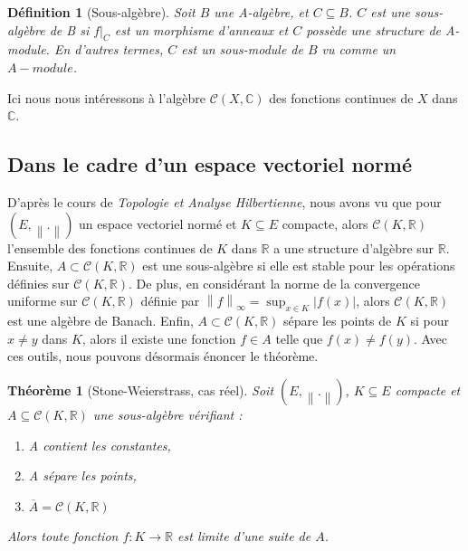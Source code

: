 \documentclass{amsart}
\newtheorem{definition}[subsubsection]{Définition}
\newtheorem{theorem}[subsubsection]{Théorème}
\begin{document}
\begin{definition}[Sous-algèbre]
	Soit \( B \) une \textit{A-algèbre}, et \( C \subseteq B \). 
	\( C \) est une \textit{sous-algèbre de B} si 
	\( {f|}_C \) est un morphisme d'anneaux 
	et \( C \) possède une structure de \textit{A-module}. 
	En d'autres termes, \( C \) est un \textit{sous-module} de \( B \) 
	vu comme un \( A-module \).
\end{definition}

Ici nous nous intéressons à l'algèbre \( \mathcal{C} (X,\mathbb{C}) \) des fonctions continues de \( X \) dans \( \mathbb{C} \).


\subsection{Dans le cadre d'un espace vectoriel normé}

D'après le cours de \textit{Topologie et Analyse Hilbertienne}, nous avons vu que pour 
\((E, {\left\lVert . \right\rVert})\) un espace vectoriel normé et \( K \subseteq E \) compacte, alors 
\( \mathcal{C}(K,\mathbb{R}) \) l'ensemble des fonctions continues de \( K \) dans \( \mathbb{R} \) a une structure d'algèbre sur \( \mathbb{R} \). 
Ensuite, \( A \subset \mathcal{C}(K,\mathbb{R}) \) est une sous-algèbre si elle est stable 
pour les opérations définies sur \( \mathcal{C}(K,\mathbb{R}) \).
De plus, en considérant la norme de la convergence uniforme sur \( \mathcal{C}(K,\mathbb{R}) \) 
définie par \( {\left\lVert f \right\rVert_{\infty}} = \sup_{x \in K}{\left\lvert f(x) \right\rvert} \),
alors \(\mathcal{C}(K,\mathbb{R}) \) est une algèbre de Banach.
Enfin, \( A \subset \mathcal{C}(K,\mathbb{R}) \) sépare les points de \( K \) si pour \( x \neq y \) dans \( K \), alors il existe une fonction \( f \in A \) telle que 
\( f(x) \neq f(y) \). Avec ces outils, nous pouvons désormais énoncer le théorème.

\begin{theorem}[Stone-Weierstrass, cas réel]
	Soit \( (E,{\left\lVert . \right\rVert}) \), \( K \subseteq E \) compacte et 
	\( A \subseteq \mathcal{C}(K,\mathbb{R}) \) une sous-algèbre vérifiant :
	\begin{enumerate}[label = (\roman*)]
		\item A contient les constantes,
		\item A sépare les points,
		\item \( \overline{A} = \mathcal{C}(K,\mathbb{R}) \)
	\end{enumerate}
	Alors toute fonction \( f : K \rightarrow \mathbb{R} \) est limite d'une suite de \( A \).
\end{theorem}
\end{document}

